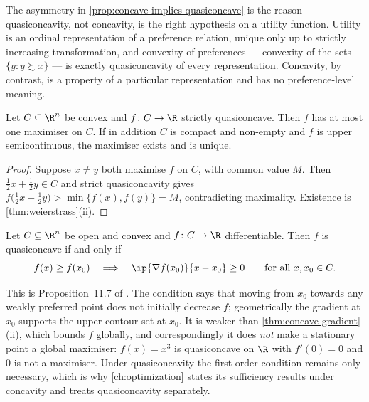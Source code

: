 The asymmetry in \autoref{prop:concave-implies-quasiconcave} is the reason
quasiconcavity, not concavity, is the right hypothesis on a utility function.
Utility is an ordinal representation of a preference relation, unique only up to
strictly increasing transformation, and convexity of preferences --- convexity of
the sets $\{y : y\succsim x\}$ --- is exactly quasiconcavity of every
representation. Concavity, by contrast, is a property of a particular
representation and has no preference-level meaning.

\begin{proposition}\label{prop:strict-quasi-unique}
	Let $C\subseteq\R^n$ be convex and $f\colon C\to\R$ strictly quasiconcave. Then
	$f$ has at most one maximiser on $C$. If in addition $C$ is compact and
	non-empty and $f$ is upper semicontinuous, the maximiser exists and is unique.
\end{proposition}

\begin{proof}
	Suppose $x\neq y$ both maximise $f$ on $C$, with common value $M$. Then
	$\tfrac12x+\tfrac12y\in C$ and strict quasiconcavity gives
	$f\bigl(\tfrac12x+\tfrac12y\bigr)>\min\{f(x),f(y)\}=M$, contradicting
	maximality. Existence is \autoref{thm:weierstrass}(ii).
\end{proof}

\begin{proposition}\label{prop:quasiconcave-gradient}
	Let $C\subseteq\R^n$ be open and convex and $f\colon C\to\R$ differentiable.
	Then $f$ is quasiconcave if and only if
	\[
		f(x)\geq f(x_0)\quad\Longrightarrow\quad\ip{\nabla f(x_0)}{x-x_0}\geq0
		\qquad\text{for all }x,x_0\in C .
	\]
\end{proposition}

This is Proposition~11.7 of \textcite[p.~396]{fukuda2026notes}. The condition
says that moving from $x_0$ towards any weakly preferred point does not initially
decrease $f$; geometrically the gradient at $x_0$ supports the upper contour set
at $x_0$. It is weaker than \autoref{thm:concave-gradient}(ii), which bounds $f$
globally, and correspondingly it does \emph{not} make a stationary point a global
maximiser: $f(x)=x^3$ is quasiconcave on $\R$ with $f'(0)=0$ and $0$ is not a
maximiser. Under quasiconcavity the first-order condition remains only necessary,
which is why \autoref{ch:optimization} states its sufficiency results under
concavity and treats quasiconcavity separately.

